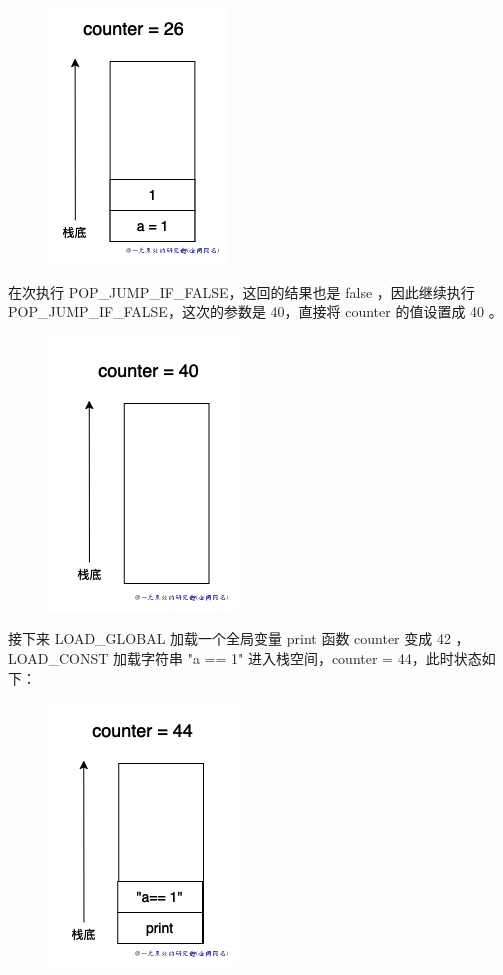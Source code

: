     \begin{figure}[H]
        \centering
            \includegraphics[scale=.25]{images/62-bytecode.png}
						\caption{ }
        \label{fig:my_label}
    \end{figure}
    
在次执行 POP\_JUMP\_IF\_FALSE，这回的结果也是 false ，因此继续执行 POP\_JUMP\_IF\_FALSE，这次的参数是 40，直接将 counter 的值设置成 40 。

    \begin{figure}[H]
        \centering
            \includegraphics[scale=.25]{images/63-bytecode.png}
						\caption{ }
        \label{fig:my_label}
    \end{figure}
    
接下来 LOAD\_GLOBAL 加载一个全局变量 print 函数 counter 变成 42 ，LOAD\_CONST 加载字符串 "a == 1" 进入栈空间，counter = 44，此时状态如下：

    \begin{figure}[H]
        \centering
            \includegraphics[scale=.25]{images/64-bytecode.png}
						\caption{ }
        \label{fig:my_label}
    \end{figure}
    
